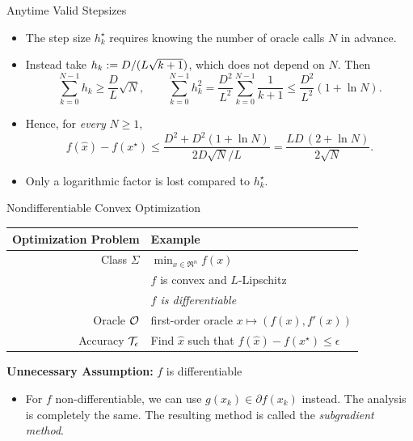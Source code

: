 \documentclass[9pt]{beamer}
\begin{document}
\begin{frame}{Anytime Valid Stepsizes}

  \begin{itemize}
  \item The step size $h_k^\star$ requires knowing the number of oracle calls $N$ in advance.
  \item<2-> Instead take $h_k := {D}/{(L\sqrt{k+1})}$, which does not depend on $N$. Then
    \[
      \sum_{k=0}^{N-1} h_k \geq \frac{D}{L}\sqrt N, \qquad \sum_{k=0}^{N-1} h_k^2 = \frac{D^2}{L^2}\sum_{k=0}^{N-1}\frac{1}{k+1} \leq \frac{D^2}{L^2}(1+\ln N).
    \]
  \item<3-> Hence, for \emph{every} $N\geq 1$,
    \[
      f(\hat x) - f(x^\star)\leq \frac{D^2 + D^2(1+\ln N)}{2 D\sqrt N/L} = \frac{L D\,(2+\ln N)}{2\sqrt N}.
    \]
  \item<4-> Only a logarithmic factor is lost compared to $h_k^\star$.
  \end{itemize}

\end{frame}

\begin{frame}{Nondifferentiable Convex Optimization}

  \begin{center}
    \begin{tabular}{r|l}
      \hline
      Optimization Problem & Example \\[0.5em]
      \hline
      Class $\Sigma$ & $\min_{x\in  \Re^n} f(x)$ \\[0.5em]
                           & $f$ is convex and $L$-Lipschitz\\[0.5em]
                           & \emph{$f$ is differentiable} \\[0.5em]
      Oracle $\mathcal O$ & first-order oracle $x\mapsto (f(x), f'(x))$\\[0.5em]
      Accuracy $\mathcal T_\epsilon$ & Find $\hat x$ such that $f(\hat x)-f(x^\star)\leq\epsilon$\\[0.5em]
      \hline
    \end{tabular}
  \end{center}

  \vfill

  \textbf{Unnecessary Assumption:} $f$ is differentiable
  \begin{itemize}
  \item For $f$ non-differentiable, we can use $g(x_k)\in \partial f(x_k)$ instead. The analysis is completely the same. The resulting method is called the \emph{subgradient method}.
  \end{itemize}
  
\end{frame}
\end{document}
